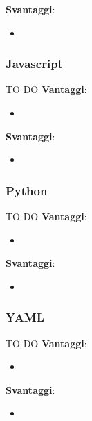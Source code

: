 		\textbf{Svantaggi}:
			\begin{itemize}
				\item 
			\end{itemize}
			\noindent

		\subsubsection{Javascript} %
		\label{ssub:javascript}
		TO DO \newline
		\textbf{Vantaggi}:
			\begin{itemize}
				\item 
			\end{itemize}
			\noindent
		
		\textbf{Svantaggi}:
			\begin{itemize}
				\item 
			\end{itemize}
			\noindent

		\subsubsection{Python} %
		\label{sub:python}
		TO DO \newline
		\textbf{Vantaggi}:
			\begin{itemize}
				\item 
			\end{itemize}
			\noindent
	
		\textbf{Svantaggi}:
			\begin{itemize}
				\item 
			\end{itemize}
			\noindent

		\subsubsection{YAML} %
		\label{ssub:yaml}
		TO DO \newline
		\textbf{Vantaggi}:
			\begin{itemize}
				\item 
			\end{itemize}
			\noindent
		
		\textbf{Svantaggi}:
			\begin{itemize}
				\item 
			\end{itemize}
			\noindent

